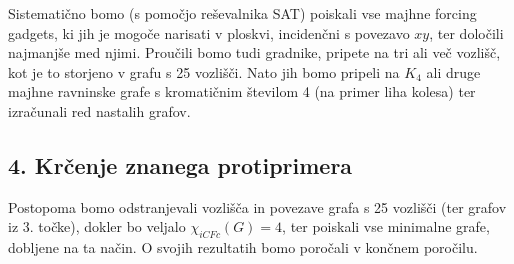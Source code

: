 \documentclass[11pt, a4paper]{article}
\begin{document}
Sistematično bomo (s pomočjo reševalnika SAT) poiskali vse majhne forcing gadgets, ki jih je mogoče narisati v ploskvi, incidenčni s povezavo $xy$, ter določili najmanjše med njimi. Proučili bomo tudi gradnike, pripete na tri ali več vozlišč, kot je to storjeno v grafu s 25 vozlišči. Nato jih bomo pripeli na $K_4$ ali druge majhne ravninske grafe s kromatičnim številom 4 (na primer liha kolesa) ter izračunali red nastalih grafov.

\subsection*{4. Krčenje znanega protiprimera}
Postopoma bomo odstranjevali vozlišča in povezave grafa s 25 vozlišči (ter grafov iz 3. točke), dokler bo veljalo $\chi_{iCFc}(G) = 4$, ter poiskali vse minimalne grafe, dobljene na ta način. O svojih rezultatih bomo poročali v končnem poročilu.
\end{document}

